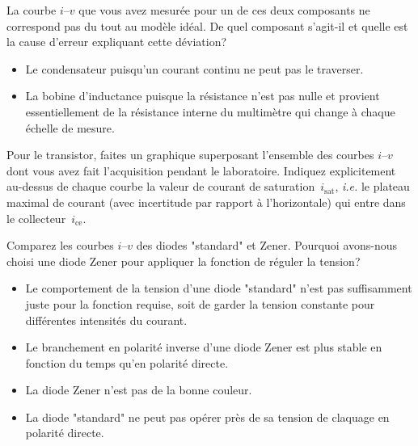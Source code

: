 \documentclass[canadien,12pt,oneside,letterpaper]{article}
\begin{document}
\begin{gradescope}[resume]
    \item La courbe $i$--$v$ que vous avez mesurée pour un de ces deux composants ne correspond pas du tout au modèle idéal. De quel composant s'agit-il et quelle est la cause d'erreur expliquant cette déviation?
    \begin{itemize}[label=$\blacktriangleright$]
            \item Le condensateur puisqu'un courant continu ne peut pas le traverser.
            \item La bobine d'inductance puisque la résistance n'est pas nulle et provient essentiellement de la résistance interne du multimètre qui change à chaque échelle de mesure.
    \end{itemize}
    \item Pour le transistor, faites un graphique superposant l'ensemble des courbes $i$--$v$ dont vous avez fait l'acquisition pendant le laboratoire. Indiquez explicitement au-dessus de chaque courbe la valeur de courant de saturation~$i_{\mathrm{sat}}$, \textit{i.e.} le plateau maximal de courant (avec incertitude par rapport à l'horizontale) qui entre dans le collecteur~$i_{\mathrm{ce}}$. %
    \item Comparez les courbes $i$--$v$ des diodes "standard" et Zener. Pourquoi avons-nous choisi une diode Zener pour appliquer la fonction de réguler la tension?
    \begin{itemize}[label=$\blacktriangleright$]
    \item Le comportement de la tension d'une diode "standard" n'est pas suffisamment juste pour la fonction requise, soit de garder la tension constante pour différentes intensités du courant.
    \item Le branchement en polarité inverse d'une diode Zener est plus stable en fonction du temps qu'en polarité directe.
    \item La diode Zener n'est pas de la bonne couleur.
    \item La diode "standard" ne peut pas opérer près de sa tension de claquage en polarité directe. 
    \end{itemize}

\end{gradescope}
\end{document}
